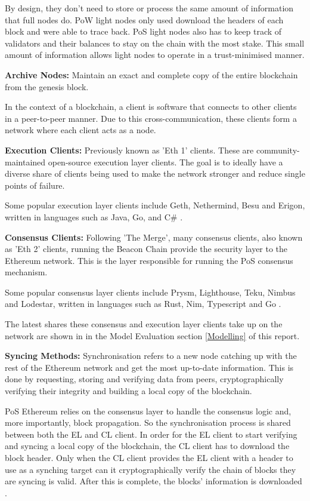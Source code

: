 By design, they don't need to store or process the same amount of information that full nodes do. PoW light nodes only used download the headers of each block and were able to trace back. PoS light nodes also has to keep track of validators and their balances to stay on the chain with the most stake. This small amount of information allows light nodes to operate in a trust-minimised manner.

\textbf{Archive Nodes:}
Maintain an exact and complete copy of the entire blockchain from the genesis block. 

In the context of a blockchain, a client is software that connects to other clients in a peer-to-peer manner. Due to this cross-communication, these clients form a network where each client acts as a node. 

\textbf{Execution Clients: }
Previously known as 'Eth 1' clients. These are community-maintained open-source execution layer clients. The goal is to ideally have a diverse share of clients being used to make the network stronger and reduce single points of failure.

Some popular execution layer clients include Geth, Nethermind, Besu and Erigon, written in languages such as Java, Go, and C\# \cite{EthereumEthereum.org}. 

\textbf{Consensus Clients: }
Following 'The Merge', many consensus clients, also known as 'Eth 2' clients, running the Beacon Chain provide the security layer to the Ethereum network. This is the layer responsible for running the PoS consensus mechanism.

Some popular consensus layer clients include Prysm, Lighthouse, Teku, Nimbus and Lodestar, written in languages 
 such as Rust, Nim, Typescript and Go \cite{EthereumEthereum.org}. 

The latest shares these consensus and execution layer clients take up on the network are shown in  in the Model Evaluation section \ref{Modelling} of this report.

\textbf{Syncing Methods:} \newline 
Synchronisation refers to a new node catching up with the rest of the Ethereum network and get the most up-to-date information. This is done by requesting, storing and verifying data from peers, cryptographically verifying their integrity and building a local copy of the blockchain.

PoS Ethereum relies on the consensus layer to handle the consensus logic and, more importantly, block propagation. So the synchronisation process is shared between both the EL and CL client. In order for the EL client to start verifying and syncing a local copy of the blockchain, the CL client has to download the block header. Only when the CL client provides the EL client with a header to use as a synching target can it cryptographically verify the chain of blocks they are syncing is valid. After this is complete, the blocks' information is downloaded \cite{2022DeveloperGo-ethereum}.

